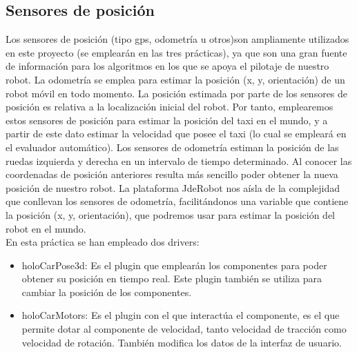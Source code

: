 \subsection{Sensores de posición}
Los sensores de posición (tipo \acrshort{gps}, odometría u otros)son ampliamente utilizados en este proyecto (se emplearán en las tres prácticas), ya que son una gran fuente de información para los algoritmos en los que se apoya el pilotaje de nuestro robot. La odometría se emplea para estimar la posición (x, y, orientación) de un robot móvil en todo momento. La posición estimada por parte de los sensores de posición es relativa a la localización inicial del robot. Por tanto, emplearemos estos sensores de posición para estimar la posición del taxi en el mundo, y a partir de este dato estimar la velocidad que posee el taxi (lo cual se empleará en el evaluador automático).  Los sensores de odometría estiman la posición de las ruedas izquierda y derecha en un intervalo de tiempo determinado. Al conocer las coordenadas de posición anteriores resulta más sencillo poder obtener la nueva posición de nuestro robot. La plataforma JdeRobot nos aísla de la complejidad que conllevan los sensores de odometría, facilitándonos una variable que contiene la posición (x, y, orientación), que podremos usar para estimar la posición del robot en el mundo.\\


En esta práctica se han empleado dos drivers: 

\begin{itemize}
\item holoCarPose3d: Es el plugin que emplearán los componentes para poder obtener su posición en tiempo real. Este plugin también se utiliza para cambiar la posición de los componentes.
\item holoCarMotors: Es el plugin con el que interactúa el componente, es el que permite dotar al componente de velocidad, tanto velocidad de tracción como velocidad de rotación. También modifica los datos de la interfaz de usuario.
\end{itemize}

